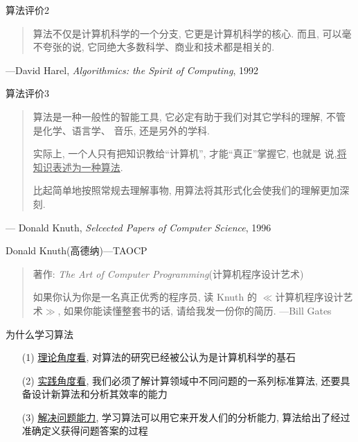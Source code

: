 \documentclass[fontset=fandol,UTF8,12pt,aspectratio=169,fleqn]{beamer}
\begin{document}
\begin{frame}{算法评价2}
\begin{quote}
算法不仅是计算机科学的一个分支, 它更是计算机科学的核心. 
而且, 可以毫不夸张的说, 它同绝大多数科学、商业和技术都是相关的. 
\end{quote}
\begin{center}
  ---David Harel, \emph{Algorithmics: the Spirit of Computing}, 1992
\end{center}
\end{frame}

\begin{frame}{算法评价3}
\begin{quote}
算法是一种一般性的智能工具, 它必定有助于我们对其它学科的理解, 不管是化学、语言学、
音乐, 还是另外的学科. 
  
实际上, 一个人只有把知识教给``计算机'', 才能``真正''掌握它, 也就是
说,\underline{将知识表述为一种算法}. 

比起简单地按照常规去理解事物, 用算法将其形式化会使我们的理解更加深刻.
\end{quote}
\begin{center}
--- Donald Knuth, \emph{Selcected Papers of Computer Science}, 1996
\end{center}
\end{frame}

\begin{frame}  {Donald Knuth(高德纳)---TAOCP}
\begin{figure}
  \centering
  \label{fig:problem}
\end{figure}
  \begin{quote}
著作: \emph{The Art of Computer Programming}(计算机程序设计艺术) 

如果你认为你是一名真正优秀的程序员, 读 Knuth 的 $\ll$计算机程序设计艺术$\gg$, 如果你能读懂整套书的话, 请给我发一份你的简历.  
\hspace{7cm}---Bill Gates
\end{quote}
\end{frame}


\begin{frame}{为什么学习算法}
\begin{itemize}[<+-|alert@+>]
\item[(1)] \underline{理论角度看}, 对算法的研究已经被公认为是计算机科学的基石
   
\item[(2)] \underline{实践角度看}, 我们必须了解计算领域中不同问题的一系列标准算法, 还要具备设计新算法和分析其效率的能力 
\item[(3)] \underline{解决问题能力}, 学习算法可以用它来开发人们的分析能力, 算法给出了经过准确定义获得问题答案的过程 
\end{itemize}
\end{frame}
\end{document}
